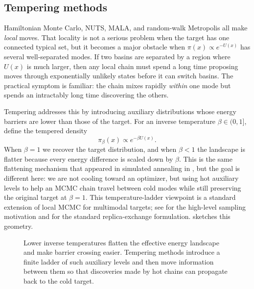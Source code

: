 \subsection{Tempering methods}
\label{subsec:tempering}

Hamiltonian Monte Carlo, NUTS, MALA, and random-walk Metropolis all make \emph{local} moves.
That locality is not a serious problem when the target has one connected typical set, but it becomes a major obstacle when $\pi(x)\propto e^{-U(x)}$ has several well-separated modes.
If two basins are separated by a region where $U(x)$ is much larger, then any local chain must spend a long time proposing moves through exponentially unlikely states before it can switch basins.
The practical symptom is familiar: the chain mixes rapidly \emph{within} one mode but spends an intractably long time discovering the others.

Tempering addresses this by introducing auxiliary distributions whose energy barriers are lower than those of the target.
For an inverse temperature $\beta\in(0,1]$, define the tempered density
\begin{equation}
  \pi_\beta(x)
  \propto
  e^{-\beta U(x)}.
  \label{eq:tempering-pi-beta}
\end{equation}
When $\beta=1$ we recover the target distribution, and when $\beta<1$ the landscape is flatter because every energy difference is scaled down by $\beta$.
This is the same flattening mechanism that appeared in simulated annealing in , but the goal is different here:
we are not cooling toward an optimizer, but using hot auxiliary levels to help an MCMC chain travel between cold modes while still preserving the original target at $\beta=1$.
This temperature-ladder viewpoint is a standard extension of local MCMC for multimodal targets; see \citet[\S5.7]{neal_2011_hmc} for the high-level sampling motivation and \citet[\S\S2.1--2.3]{earl_deem_2005_parallel_tempering} for the standard replica-exchange formulation.
 sketches this geometry.

\begin{figure}[H]
  \centering
  
  \caption{Lower inverse temperatures flatten the effective energy landscape and make barrier crossing easier.
  Tempering methods introduce a finite ladder of such auxiliary levels and then move information between them so that discoveries made by hot chains can propagate back to the cold target.}
  \label{fig:tempering-ladder}
\end{figure}

